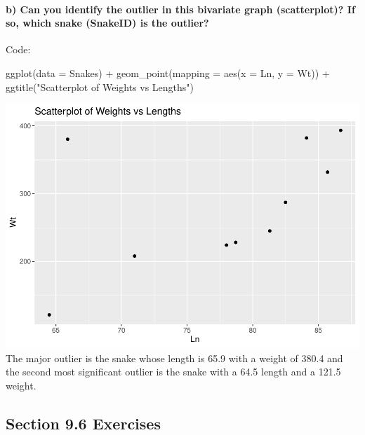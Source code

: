 \documentclass[
]{article}
\newenvironment{Shaded}{\begin{snugshade}}{\end{snugshade}}
\newcommand{\AttributeTok}[1]{\textcolor[rgb]{0.77,0.63,0.00}{#1}}
\newcommand{\FunctionTok}[1]{\textcolor[rgb]{0.00,0.00,0.00}{#1}}
\newcommand{\NormalTok}[1]{#1}
\newcommand{\SpecialCharTok}[1]{\textcolor[rgb]{0.00,0.00,0.00}{#1}}
\newcommand{\StringTok}[1]{\textcolor[rgb]{0.31,0.60,0.02}{#1}}
\begin{document}
\hypertarget{b-can-you-identify-the-outlier-in-this-bivariate-graph-scatterplot-if-so-which-snake-snakeid-is-the-outlier}{%
\paragraph{b) Can you identify the outlier in this bivariate graph
(scatterplot)? If so, which snake (SnakeID) is the
outlier?}\label{b-can-you-identify-the-outlier-in-this-bivariate-graph-scatterplot-if-so-which-snake-snakeid-is-the-outlier}}

Code:

\begin{Shaded}
\begin{Highlighting}[]
\FunctionTok{ggplot}\NormalTok{(}\AttributeTok{data =}\NormalTok{ Snakes) }\SpecialCharTok{+}
  \FunctionTok{geom\_point}\NormalTok{(}\AttributeTok{mapping =} \FunctionTok{aes}\NormalTok{(}\AttributeTok{x =}\NormalTok{ Ln, }\AttributeTok{y =}\NormalTok{ Wt)) }\SpecialCharTok{+}
  \FunctionTok{ggtitle}\NormalTok{(}\StringTok{"Scatterplot of Weights vs Lengths"}\NormalTok{)}
\end{Highlighting}
\end{Shaded}

\includegraphics{Class_Exercises_ClassNotes_5_files/figure-latex/unnamed-chunk-17-1.pdf}
The major outlier is the snake whose length is 65.9 with a weight of
380.4 and the second most significant outlier is the snake with a 64.5
length and a 121.5 weight. \newpage

\hypertarget{section-9.6-exercises}{%
\subsection{Section 9.6 Exercises}\label{section-9.6-exercises}}
\end{document}
